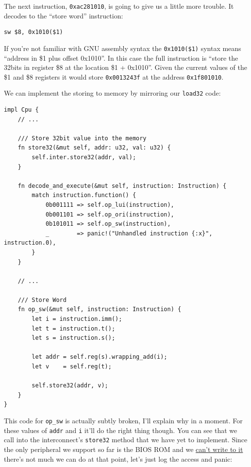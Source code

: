 \documentclass[a4paper]{article}
\newcommand{\code}[1] {\texttt{#1}}
\begin{document}
The next instruction, \code{0xac281010}, is going to give us a
little more trouble. It decodes to the ``store word'' instruction:

\begin{lstlisting}[language=assembly]
sw $8, 0x1010($1)
\end{lstlisting}

If you're not familiar with GNU assembly syntax the
\code{0x1010(\$1)} syntax means ``address in \$1 plus offset
0x1010''. In this case the full instruction is ``store the 32bits in
register \$8 at the location \$1 + 0x1010''. Given the current values
of the \$1 and \$8 registers it would store \code{0x0013243f} at the
address \code{0x1f801010}.

We can implement the storing to memory by mirroring our
\code{load32} code:

\begin{lstlisting}
impl Cpu {
    // ...

    /// Store 32bit value into the memory
    fn store32(&mut self, addr: u32, val: u32) {
        self.inter.store32(addr, val);
    }

    fn decode_and_execute(&mut self, instruction: Instruction) {
        match instruction.function() {
            0b001111 => self.op_lui(instruction),
            0b001101 => self.op_ori(instruction),
            0b101011 => self.op_sw(instruction),
            _        => panic!("Unhandled instruction {:x}", instruction.0),
        }
    }

    // ...

    /// Store Word
    fn op_sw(&mut self, instruction: Instruction) {
        let i = instruction.imm();
        let t = instruction.t();
        let s = instruction.s();

        let addr = self.reg(s).wrapping_add(i);
        let v    = self.reg(t);

        self.store32(addr, v);
    }
}
\end{lstlisting}

This code for \code{op\_sw} is actually subtly broken, I'll explain
why in a moment. For these values of \code{addr} and \code{i}
it'll do the right thing though. You can see that we call into the
interconnect's \code{store32} method that we have yet to
implement. Since the only peripheral we support so far is the BIOS ROM
and we
\href{https://github.com/simias/psx-hardware-tests/blob/master/tests/bios_write/main.s}{can't
  write to it} there's not much we can do at that point, let's just
log the access and panic:
\end{document}
